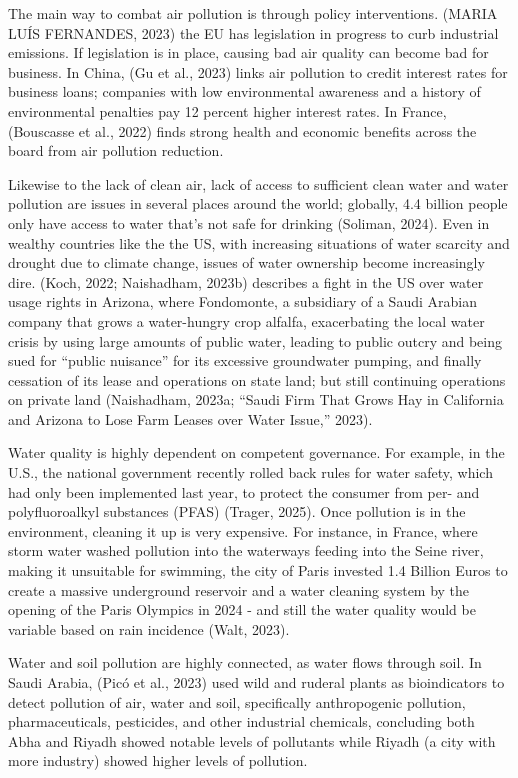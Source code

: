 \documentclass[
  12pt,
  letterpaper,
  DIV=11,
  numbers=noendperiod]{scrartcl}
\begin{document}
The main way to combat air pollution is through policy interventions.
(MARIA LUÍS FERNANDES, 2023) the EU has legislation in progress to curb
industrial emissions. If legislation is in place, causing bad air
quality can become bad for business. In China, (Gu et al., 2023) links
air pollution to credit interest rates for business loans; companies
with low environmental awareness and a history of environmental
penalties pay 12 percent higher interest rates. In France, (Bouscasse et
al., 2022) finds strong health and economic benefits across the board
from air pollution reduction.

Likewise to the lack of clean air, lack of access to sufficient clean
water and water pollution are issues in several places around the world;
globally, 4.4 billion people only have access to water that's not safe
for drinking (Soliman, 2024). Even in wealthy countries like the the US,
with increasing situations of water scarcity and drought due to climate
change, issues of water ownership become increasingly dire. (Koch, 2022;
Naishadham, 2023b) describes a fight in the US over water usage rights
in Arizona, where Fondomonte, a subsidiary of a Saudi Arabian company
that grows a water-hungry crop alfalfa, exacerbating the local water
crisis by using large amounts of public water, leading to public outcry
and being sued for ``public nuisance'' for its excessive groundwater
pumping, and finally cessation of its lease and operations on state
land; but still continuing operations on private land (Naishadham,
2023a; {``Saudi Firm That Grows Hay in {California} and {Arizona} to
Lose Farm Leases over Water Issue,''} 2023).

Water quality is highly dependent on competent governance. For example,
in the U.S., the national government recently rolled back rules for
water safety, which had only been implemented last year, to protect the
consumer from per- and polyfluoroalkyl substances (PFAS) (Trager, 2025).
Once pollution is in the environment, cleaning it up is very expensive.
For instance, in France, where storm water washed pollution into the
waterways feeding into the Seine river, making it unsuitable for
swimming, the city of Paris invested 1.4 Billion Euros to create a
massive underground reservoir and a water cleaning system by the opening
of the Paris Olympics in 2024 - and still the water quality would be
variable based on rain incidence (Walt, 2023).

Water and soil pollution are highly connected, as water flows through
soil. In Saudi Arabia, (Picó et al., 2023) used wild and ruderal plants
as bioindicators to detect pollution of air, water and soil,
specifically anthropogenic pollution, pharmaceuticals, pesticides, and
other industrial chemicals, concluding both Abha and Riyadh showed
notable levels of pollutants while Riyadh (a city with more industry)
showed higher levels of pollution.
\end{document}
